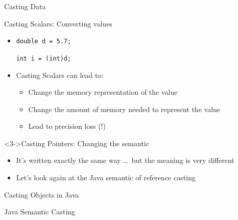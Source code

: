 \begin{Coupe}
\begin{frame}{Casting Data}
  \begin{block}{Casting Scalars: Converting values}
    \begin{itemize}\vspace{-.2\baselineskip}
    \item \texttt{double d = 5.7;} ~~~~

      \texttt{int i = (int)d;} ~~~~

    \item<2-> Casting Scalars can lead to:
      \begin{itemize}
      \item Change the memory representation of the value
      \item Change the amount of memory needed to represent the value
      \item Lead to precision loss (!)
      \end{itemize}
    \end{itemize}
  \end{block}\vspace{-.5\baselineskip}

  \begin{block}<3->{Casting Pointers: Changing the semantic}
    \begin{itemize}\vspace{-.2\baselineskip}
    \item It's written exactly the same way \ldots\ but the meaning is very different
    \item Let's look again at the Java semantic of reference casting
    \end{itemize}
  \end{block}
\end{frame}
\begin{frame}{Casting Objects in Java}
  \begin{block}{Java Semantic Casting}
    \begin{columns}
      \begin{column}{.3\linewidth}
      \end{column}


\end{columns}
\end{block}
\end{frame}
\end{Coupe}
